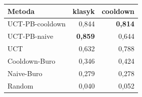 \begin{tabular}{lrr}
\toprule
Metoda & klasyk & cooldown \\
\midrule
UCT-PB-cooldown & 0,844 & \textbf{0,814} \\
UCT-PB-naive & \textbf{0,859} & 0,644 \\
UCT & 0,632 & 0,788 \\
Cooldown-Buro & 0,346 & 0,424 \\
Naive-Buro & 0,279 & 0,278 \\
Random & 0,040 & 0,052 \\
\bottomrule
\end{tabular}